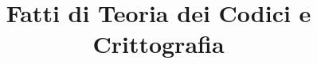 \documentclass[a4paper,NoNotes,GeneralMath]{stdmdoc}
\begin{document}
	\title{Fatti di Teoria dei Codici e Crittografia}
\end{document}
